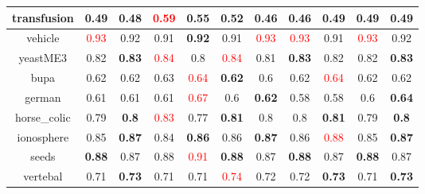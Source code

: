 \documentclass{article}%
\begin{document}
\begin{tabular}{c|cccccccccc}
\hline%
transfusion&\textbf{0.49}&0.48&\textcolor{red}{ 
0.59
}&0.55&\textbf{0.52}&0.46&0.46&\textbf{0.49}&0.49&0.49\\%
\hline%
vehicle&\textcolor{red}{ 
0.93
}&0.92&0.91&\textbf{0.92}&0.91&\textcolor{red}{ 
0.93
}&\textcolor{red}{ 
0.93
}&0.91&\textcolor{red}{ 
0.93
}&0.92\\%
\hline%
yeastME3&0.82&\textbf{0.83}&\textcolor{red}{ 
0.84
}&0.8&\textcolor{red}{ 
0.84
}&0.81&\textbf{0.83}&0.82&0.82&\textbf{0.83}\\%
\hline%
bupa&0.62&0.62&0.63&\textcolor{red}{ 
0.64
}&\textbf{0.62}&0.6&0.62&\textcolor{red}{ 
0.64
}&0.62&0.62\\%
\hline%
german&0.61&0.61&0.61&\textcolor{red}{ 
0.67
}&0.6&\textbf{0.62}&0.58&0.58&0.6&\textbf{0.64}\\%
\hline%
horse\_colic&0.79&\textbf{0.8}&\textcolor{red}{ 
0.83
}&0.77&\textbf{0.81}&0.8&0.8&\textbf{0.81}&0.79&\textbf{0.8}\\%
\hline%
ionosphere&0.85&\textbf{0.87}&0.84&\textbf{0.86}&0.86&\textbf{0.87}&0.86&\textcolor{red}{ 
0.88
}&0.85&\textbf{0.87}\\%
\hline%
seeds&\textbf{0.88}&0.87&0.88&\textcolor{red}{ 
0.91
}&\textbf{0.88}&0.87&\textbf{0.88}&0.87&\textbf{0.88}&0.87\\%
\hline%
vertebal&0.71&\textbf{0.73}&0.71&0.71&\textcolor{red}{ 
0.74
}&0.72&0.72&\textbf{0.73}&0.71&\textbf{0.73}\\%
\hline%
\end{tabular}

%
\end{document}
